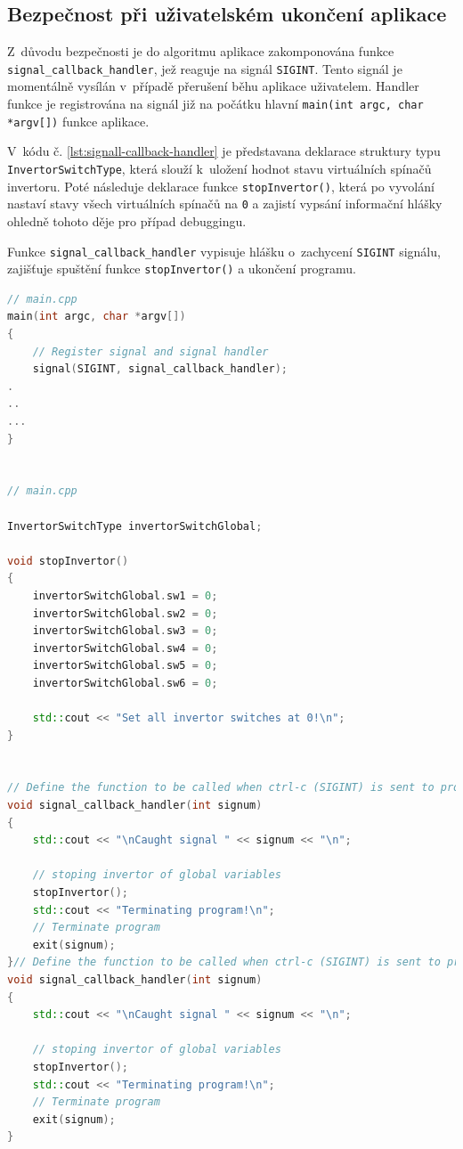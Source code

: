 \documentclass[a4paper, twoside, 11pt]{article}
\begin{document}
	\subsection{Bezpečnost při uživatelském ukončení aplikace}
	Z~důvodu bezpečnosti je do algoritmu aplikace zakomponována funkce \texttt{signal\_callback\_handler}, jež reaguje na signál \texttt{SIGINT}. Tento signál je momentálně vysílán v~případě přerušení běhu aplikace uživatelem. Handler funkce je registrována na signál již na počátku hlavní \texttt{main(int argc, char *argv[])} funkce aplikace.\par
	V~kódu č. \ref{lst:signall-callback-handler} je představana deklarace struktury typu \texttt{InvertorSwitchType}, která slouží k~uložení hodnot stavu virtuálních spínačů invertoru. Poté následuje deklarace funkce \texttt{stopInvertor()}, která po vyvolání nastaví stavy všech virtuálních spínačů na \texttt{0} a zajistí vypsání informační hlášky ohledně tohoto děje pro případ debuggingu.\par
	Funkce \texttt{signal\_callback\_handler} vypisuje hlášku o~zachycení \texttt{SIGINT} signálu, zajišťuje spuštění funkce \texttt{stopInvertor()} a ukončení programu.

	\begin{lstlisting}[language={c++}, caption={signal\_callback\_handler funkce a její registrace na signál SIGINT}, label={lst:signall-callback-handler}]
// main.cpp
main(int argc, char *argv[])
{
	// Register signal and signal handler
	signal(SIGINT, signal_callback_handler);
.
..
...
}


// main.cpp

InvertorSwitchType invertorSwitchGlobal;

void stopInvertor()
{
    invertorSwitchGlobal.sw1 = 0;
    invertorSwitchGlobal.sw2 = 0;
    invertorSwitchGlobal.sw3 = 0;
    invertorSwitchGlobal.sw4 = 0;
    invertorSwitchGlobal.sw5 = 0;
    invertorSwitchGlobal.sw6 = 0;

    std::cout << "Set all invertor switches at 0!\n";
}


// Define the function to be called when ctrl-c (SIGINT) is sent to process
void signal_callback_handler(int signum)
{
    std::cout << "\nCaught signal " << signum << "\n";

    // stoping invertor of global variables
    stopInvertor();
    std::cout << "Terminating program!\n";
    // Terminate program
    exit(signum);
}// Define the function to be called when ctrl-c (SIGINT) is sent to process
void signal_callback_handler(int signum)
{
    std::cout << "\nCaught signal " << signum << "\n";

    // stoping invertor of global variables
    stopInvertor();
    std::cout << "Terminating program!\n";
    // Terminate program
    exit(signum);
}\end{lstlisting}
\end{document}
